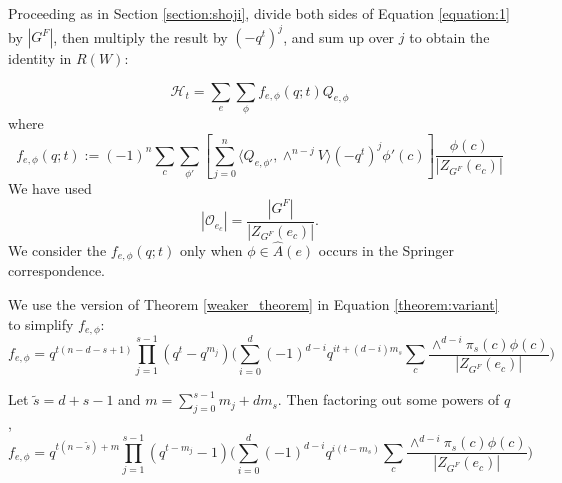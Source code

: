 \documentclass[10pt]{amsart}
\newcommand{\orbit}{\mathcal O}
\newcommand{\ar}{{\hat{A}}(e)}
\renewcommand{\H}{{\mathcal{H}_t}}
\newcommand{\ttau}{\tilde{\tau}}
\theoremstyle{plain}
\theoremstyle{definition}
\theoremstyle{remark}
\begin{document}
Proceeding as in Section \ref{section:shoji},
divide both sides of Equation \ref{equation:1} by $|G^F|$, then multiply the result by $(-q^t)^j$, and sum up over $j$
to obtain the identity in $R(W)$:

\begin{equation} \label{Main_equation_3}
\H =   \sum_{e}  \sum_{\phi} f_{e, \phi}(q;t) Q_{e, \phi}
\end{equation}
where
\begin{equation*}
f_{e, \phi}(q;t) := (-1)^n \sum_c  \sum_{\phi'} \left[ \sum^n_{j=0} \langle Q_{e, \phi'}, \wedge^{n-j} V \rangle  (-q^{t})^j \phi'(c) \right] \frac{ \phi(c)}{|Z_{G^F}(e_c)|}
\end{equation*}
We have used $$| \orbit_{e_c} | = \frac{|G^F|}{|Z_{G^F}(e_c )|}.$$
We consider the $f_{e, \phi}(q;t)$ only when $\phi \in \ar$ occurs in the Springer correspondence. 

We use the version of Theorem \ref{weaker_theorem} in Equation \ref{theorem:variant} to simplify $f_{e, \phi}$:
\begin{equation*}
f_{e, \phi} = q^{t(n - d -s +1)} \prod_{j=1}^{s-1} (q^{t} - q^{ m_j}) 
\big( \sum_{i=0}^d (-1)^{d-i} q^{it + (d-i)m_s}  \sum_c  \frac{ \!\wedge^{d-i}  \pi_s(c) \phi(c)} {|Z_{G^F}(e_c)|} \big)
\end{equation*}

Let $\tilde{s} = d+s-1$ and $m = \sum_{j=0}^{s-1} m_j + dm_s$.  
Then factoring out some powers of $q$,
\begin{equation}  \label{formula:f}
f_{e, \phi} = q^{t(n - \tilde{s})+ m} \prod_{j=1}^{s-1} (q^{t-m_j} - 1)
\big( \sum_{i=0}^d (-1)^{d-i} q^{i(t - m_s)}  \sum_c  \frac{ \!\wedge^{d-i}  \pi_s(c) \phi(c)} {|Z_{G^F}(e_c)|} \big)
\end{equation}







\end{document}
